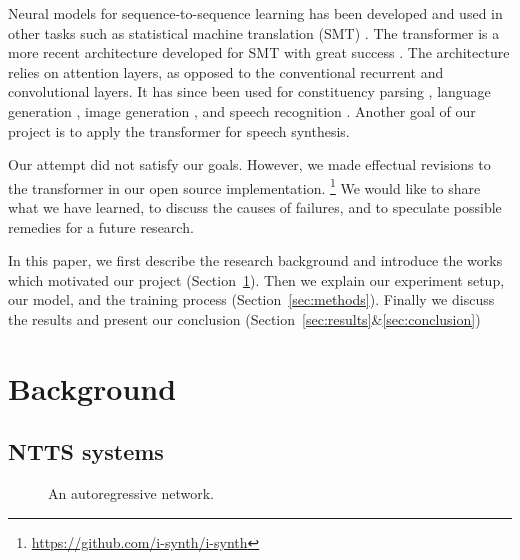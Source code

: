 \documentclass[11pt]{article}
\begin{document}
Neural models for sequence-to-sequence learning has been developed and used in other tasks
such as statistical machine translation (SMT) \parencite{cho2014learning, sutskever2014sequence}.
The transformer is a more recent architecture developed for SMT with great success \parencite{vaswani2017attention}.
The architecture relies on attention layers,
as opposed to the conventional recurrent and convolutional layers.
It has since been used for constituency parsing \parencite{kitaev2018constituency},
language generation \parencite{liu2018generating},
image generation \parencite{parmar2018image},
and speech recognition \parencite{zhou2018syllable, zhou2018multilingual}.
Another goal of our project is to apply the transformer for speech synthesis.

Our attempt did not satisfy our goals.
However, we made effectual revisions to the transformer in our open source implementation.%
\footnote{\url{https://github.com/i-synth/i-synth}}
We would like to share what we have learned,
to discuss the causes of failures,
and to speculate possible remedies for a future research.

In this paper, we first describe the research background
and introduce the works which motivated our project (Section~\ref{sec:background}).
Then we explain our experiment setup, our model,
and the training process (Section~\ref{sec:methods}).
Finally we discuss the results and present our conclusion
(Section~\ref{sec:results}\&\ref{sec:conclusion})

\section{Background}\label{sec:background}

\subsection{NTTS systems}

\begin{figure}
\centering
{}
\caption[]{\label{fig:autoreg}An autoregressive network.}
\end{figure}
\end{document}
